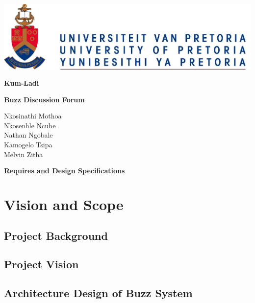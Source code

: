 \documentclass[12pt]{article}
\begin{document}
	 \begin{titlepage}
		 \begin{center}
			 \includegraphics[scale=1]{diagrams/up.png}
			 \\
			 \begin{huge}
			 	 \textbf{Kum-Ladi}

				  \textbf{Buzz Discussion Forum}\\
			 \end{huge}

			 \begin{small}
				 Nkosinathi Mothoa\\
				 Nkosenhle Ncube\\
			 	 Nathan Ngobale\\
			 	 Kamogelo Tsipa\\
			 	 Melvin Zitha\\ 
			 \end{small}

			 \begin{huge}
				 \textbf{Requires and Design Specifications}
			 \end{huge}

		 \end{center}
	 \end{titlepage}

	 \section{Vision and Scope}
		 \subsection{Project Background}

		 \subsection{Project Vision} 

		 \subsection{Architecture Design of Buzz System}
\end{document}
